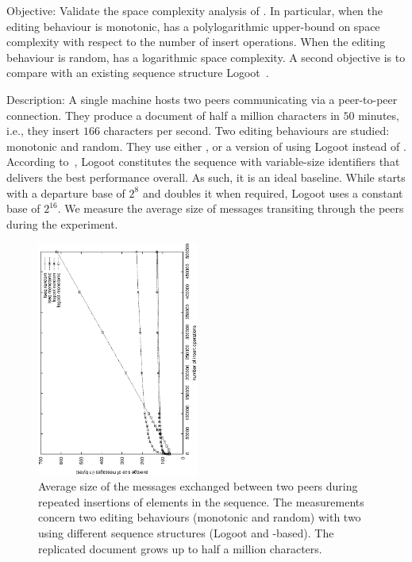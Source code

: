 \begin{asparadesc}
\item [Objective:] Validate the space complexity analysis of \LSEQ. In
  particular, when the editing behaviour is monotonic, \LSEQ has a
  polylogarithmic upper-bound on space complexity with respect to the number of
  insert operations. When the editing behaviour is random, \LSEQ has a
  logarithmic space complexity. A second objective is to compare \LSEQ with
  an existing sequence structure
  Logoot~\cite{weiss2009logoot,weiss2010logootundo}.
\item [Description:] A single machine hosts two peers communicating via a
  peer-to-peer connection. They produce a document of half a million characters
  in $50$ minutes, i.e., they insert $166$ characters per second. Two editing
  behaviours are studied: monotonic and random. They use either \CRATE,
  or a version of \CRATE using Logoot instead of \LSEQ. According
  to~\cite{ahmed2011evaluating}, Logoot constitutes the sequence with
  variable-size identifiers that delivers the best performance overall. As
  such, it is an ideal baseline. While \LSEQ starts with a departure base of
  $2^8$ and doubles it when required, Logoot uses a constant base of
  $2^{16}$. We measure the average size of messages transiting through the
  peers during the experiment.

\begin{figure}
  \centering
  \includegraphics[angle=-90,width=0.475\textwidth]{./img/complexities.eps}
  \caption{\label{fig:complexities} Average size of the messages exchanged
    between two peers during repeated insertions of elements in the
    sequence. The measurements concern two editing behaviours (monotonic and
    random) with two \CRATE using different sequence structures (Logoot
    and \LSEQ-based). The replicated document grows up to half a million
    characters.}
\end{figure}


\end{asparadesc}
